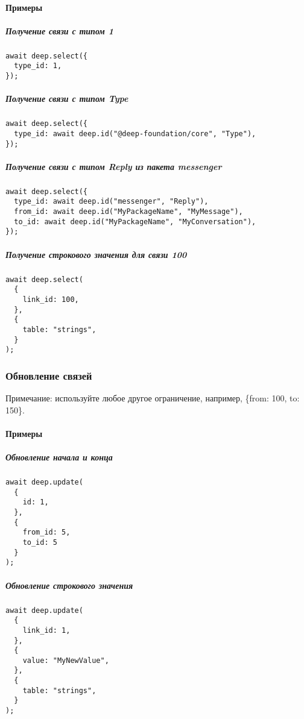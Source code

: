 \paragraph{Примеры}

\subparagraph{Получение связи с типом 1}
\leavevmode
\begin{lstlisting}
await deep.select({
  type_id: 1,
});
\end{lstlisting}

\subparagraph{Получение связи с типом Type}
\leavevmode
\begin{lstlisting}
await deep.select({
  type_id: await deep.id("@deep-foundation/core", "Type"),
});
\end{lstlisting}

\subparagraph{Получение связи с типом Reply из пакета messenger}
\leavevmode
\begin{lstlisting}
await deep.select({
  type_id: await deep.id("messenger", "Reply"),
  from_id: await deep.id("MyPackageName", "MyMessage"),
  to_id: await deep.id("MyPackageName", "MyConversation"),
});
\end{lstlisting}

\subparagraph{Получение строкового значения для связи 100}
\leavevmode
\begin{lstlisting}
await deep.select(
  {
    link_id: 100,
  },
  {
    table: "strings",
  }
);
\end{lstlisting}

\subsubsection{Обновление связей}

Примечание: используйте любое другое ограничение, например, \{from: 100, to:
150\}.

\paragraph{Примеры}

\subparagraph{Обновление начала и конца}
\leavevmode
\begin{lstlisting}
await deep.update(
  {
    id: 1,
  },
  {
    from_id: 5,
    to_id: 5
  }
);
\end{lstlisting}

\subparagraph{Обновление строкового значения}
\leavevmode
\begin{lstlisting}
await deep.update(
  {
    link_id: 1,
  },
  {
    value: "MyNewValue",
  },
  {
    table: "strings",
  }
);
\end{lstlisting}

